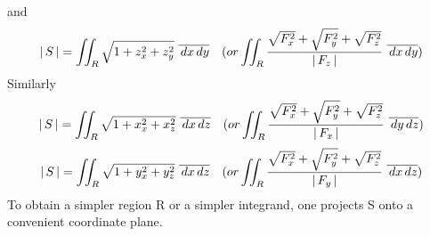 \documentclass[11pt]{amsbook}
\begin{document}
    

    and
    \begin{equation*}
        \hAbs{S}= \iint_R \sqrt{1+z_{x}^{2}+z_{y}^{2}}\ \overline {\,dx \,dy}\quad (or \iint_R \frac{\sqrt{F_{x}^{2}}+\sqrt{F_{y}^{2}}+\sqrt{F_{z}^{2}}}{\hAbs{F_{z}}}\ \overline {\,dx \,dy})
    \end{equation*}
    Similarly
        \begin{equation*}
        \hAbs{S}= \iint_R \sqrt{1+x_{x}^{2}+x_{z}^{2}}\ \overline {\,dx \,dz}\quad (or \iint_R \frac{\sqrt{F_{x}^{2}}+\sqrt{F_{y}^{2}}+\sqrt{F_{z}^{2}}}{\hAbs{F_{x}}}\ \overline {\,dy \,dz})
    \end{equation*}
        \begin{equation*}
        \hAbs{S}= \iint_R \sqrt{1+y_{x}^{2}+y_{z}^{2}}\ \overline {\,dx \,dz}\quad (or \iint_R \frac{\sqrt{F_{x}^{2}}+\sqrt{F_{y}^{2}}+\sqrt{F_{z}^{2}}}{\hAbs{F_{y}}}\ \overline {\,dx \,dz})
    \end{equation*}
    To obtain a simpler region R or a simpler integrand, one
projects S onto a convenient coordinate plane. 
\end{document}
